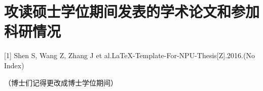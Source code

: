 \chapter*{攻读硕士学位期间发表的学术论文和参加科研情况}
\newlength{\oldparindent}
\setlength{\oldparindent}{\parindent}
\setlength{\parindent}{0pt}

[1]	Shen S, Wang Z, Zhang J et al.{{\LaTeX}}-Template-For-NPU-Thesis[Z].2016.(No Index)

\setlength{\parindent}{\oldparindent}
（博士们记得更改成博士学位期间）

\clearpage
\endinput
